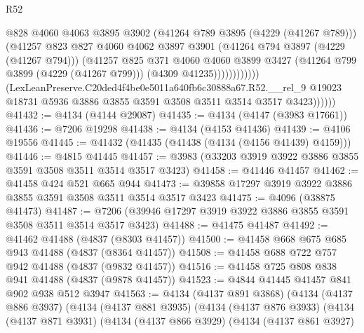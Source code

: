 \begin{lexlean}{R52}
\begin{coremodule}
                                @828
                                @4060
                                @4063
                                @3895
                                @3902
                                (@41264 @789 @3895 (@4229 (@41267 @789)))
                                (@41257
                                  @823
                                  @827
                                  @4060
                                  @4062
                                  @3897
                                  @3901
                                  (@41264 @794 @3897 (@4229 (@41267 @794)))
                                  (@41257
                                    @825
                                    @371
                                    @4060
                                    @4060
                                    @3899
                                    @3427
                                    (@41264 @799 @3899 (@4229 (@41267 @799)))
                                    (@4309 @41235))))))))))))
              (LexLeanPreserve.C20ded4f4be0e5011a640fb6c30888a67.R52.__rel_9
                @19023
                @18731
                @5936
                @3886
                @3855
                @3591
                @3508
                @3511
                @3514
                @3517
                @3423))))))
@41432 := @4134 (@4144 @29087)
@41435 := @4134 (@4147 (@3983 @17661))
@41436 := @7206 @19298
@41438 := @4134 (@4153 @41436)
@41439 := @4106 @19556
@41445 := @41432 (@41435 (@41438 (@4134 (@4156 @41439) @4159)))
@41446 := @4815 @41445
@41457 := @3983 (@33203 @3919 @3922 @3886 @3855 @3591 @3508 @3511 @3514 @3517 @3423)
@41458 := @41446 @41457
@41462 := @41458 @424 @521 @665 @944
@41473 := @39858 @17297 @3919 @3922 @3886 @3855 @3591 @3508 @3511 @3514 @3517 @3423
@41475 := @4096 (@38875 @41473)
@41487 := @7206 (@39946 @17297 @3919 @3922 @3886 @3855 @3591 @3508 @3511 @3514 @3517 @3423)
@41488 := @41475 @41487
@41492 := @41462 @41488 (@4837 (@8303 @41457))
@41500 := @41458 @668 @675 @685 @943 @41488 (@4837 (@8364 @41457))
@41508 := @41458 @688 @722 @757 @942 @41488 (@4837 (@9832 @41457))
@41516 := @41458 @725 @808 @838 @941 @41488 (@4837 (@9878 @41457))
@41523 := @4844 @41445 @41457 @841 @902 @938 @512 @3947
@41563 := @4134
    (@4137 @891 @3868)
    (@4134
      (@4137 @886 @3937)
      (@4134
        (@4137 @881 @3935)
        (@4134
          (@4137 @876 @3933)
          (@4134
            (@4137 @871 @3931)
            (@4134
              (@4137 @866 @3929)
              (@4134
                (@4137 @861 @3927)

\end{coremodule}
\end{lexlean}
